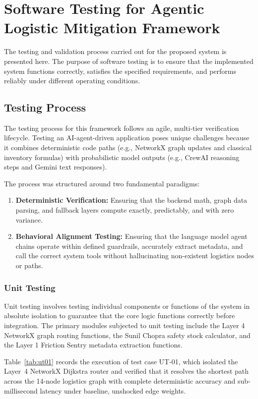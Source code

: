 \chapter[Software Testing  for Agentic Logistic Mitigation Framework]{Software Testing for Agentic Logistic Mitigation Framework}

The testing and validation process carried out for the proposed system is presented here. The purpose of software testing is to ensure that the implemented system functions correctly, satisfies the specified requirements, and performs reliably under different operating conditions.

\section{Testing Process}
The testing process for this framework follows an agile, multi-tier verification lifecycle. Testing an AI-agent-driven application poses unique challenges because it combines deterministic code paths (e.g., NetworkX graph updates and classical inventory formulas) with probabilistic model outputs (e.g., CrewAI reasoning steps and Gemini text responses). 

The process was structured around two fundamental paradigms:
\begin{enumerate}[label=(\roman*)]
    \item \textbf{Deterministic Verification:} Ensuring that the backend math, graph data parsing, and fallback layers compute exactly, predictably, and with zero variance.
    \item \textbf{Behavioral Alignment Testing:} Ensuring that the language model agent chains operate within defined guardrails, accurately extract metadata, and call the correct system tools without hallucinating non-existent logistics nodes or paths.
\end{enumerate}

\subsection{Unit Testing}
Unit testing involves testing individual components or functions of the system in absolute isolation to guarantee that the core logic functions correctly before integration. The primary modules subjected to unit testing include the Layer 4 NetworkX graph routing functions, the Sunil Chopra safety stock calculator, and the Layer 1 Friction Sentry metadata extraction functions.

Table~\ref{tab:ut01} records the execution of test case UT-01, which isolated the Layer~4 NetworkX Dijkstra router and verified that it resolves the shortest path across the 14-node logistics graph with complete deterministic accuracy and sub-millisecond latency under baseline, unshocked edge weights.

